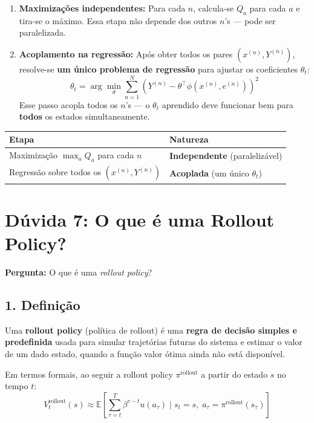 \documentclass[12pt,a4paper]{article}
\begin{document}
\begin{enumerate}
    \item \textbf{Maximizações independentes:} Para cada $n$, calcula-se $Q_a$ para cada $a$ e tira-se o máximo. Essa etapa não depende dos outros $n$'s --- pode ser paralelizada.

    \item \textbf{Acoplamento na regressão:} Após obter todos os pares $(x^{(n)}, Y^{(n)})$, resolve-se \textbf{um único problema de regressão} para ajustar os coeficientes $\theta_t$:
    \begin{equation}
        \theta_t = \arg\min_{\theta} \sum_{n=1}^{N} \left( Y^{(n)} - \theta^\top \phi(x^{(n)}, e^{(n)}) \right)^2
    \end{equation}
    Esse passo acopla todos os $n$'s --- o $\theta_t$ aprendido deve funcionar bem para \textbf{todos} os estados simultaneamente.
\end{enumerate}

\begin{center}
\begin{tabular}{ll}
\hline
\textbf{Etapa} & \textbf{Natureza} \\
\hline
Maximização $\max_a Q_a$ para cada $n$ & \textbf{Independente} (paralelizável) \\
Regressão sobre todos os $(x^{(n)}, Y^{(n)})$ & \textbf{Acoplada} (um único $\theta_t$) \\
\hline
\end{tabular}
\end{center}

\section{Dúvida 7: O que é uma Rollout Policy?}

\textbf{Pergunta:} O que é uma \textit{rollout policy}?

\subsection{1. Definição}

Uma \textbf{rollout policy} (política de rollout) é uma \textbf{regra de decisão simples e predefinida} usada para simular trajetórias futuras do sistema e estimar o valor de um dado estado, quando a função valor ótima ainda não está disponível.

Em termos formais, ao seguir a rollout policy $\pi^{\text{rollout}}$ a partir do estado $s$ no tempo $t$:
\begin{equation}
    V_t^{\text{rollout}}(s) \approx \mathbb{E}\!\left[\sum_{\tau=t}^{T} \beta^{\tau-t} u(a_\tau) \;\Bigg|\; s_t = s,\; a_\tau = \pi^{\text{rollout}}(s_\tau)\right]
\end{equation}
\end{document}
